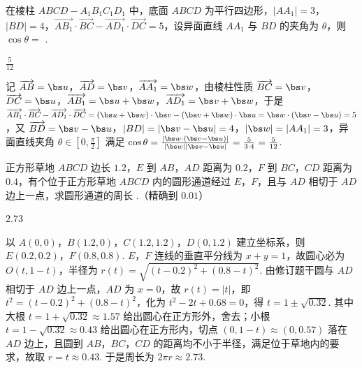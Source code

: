 \begin{problem}
在棱柱 \(ABCD-A_1B_1C_1D_1\) 中，底面 \(ABCD\) 为平行四边形，\(\left|AA_1\right|=3\)，\(\left|BD\right|=4\)，\(\overrightarrow{AB_1}\cdot\overrightarrow{BC}-\overrightarrow{AD_1}\cdot\overrightarrow{DC}=5\)，设异面直线 \(AA_1\) 与 \(BD\) 的夹角为 \(\theta\)，则 \(\cos\theta=\)\fillinblank{} .
\end{problem}

\begin{answer}
\(\frac{5}{12}\)
\end{answer}

\begin{solution}
记 \(\overrightarrow{AB}=\bs u\)，\(\overrightarrow{AD}=\bs v\)，\(\overrightarrow{AA_{1}}=\bs w\)，由棱柱性质 \(\overrightarrow{BC}=\bs v\)，\(\overrightarrow{DC}=\bs u\)，\(\overrightarrow{AB_{1}}=\bs u+\bs w\)，\(\overrightarrow{AD_{1}}=\bs v+\bs w\)，于是 \(\overrightarrow{AB_{1}}\cdot\overrightarrow{BC}-\overrightarrow{AD_{1}}\cdot\overrightarrow{DC}=\left(\bs u+\bs w\right)\cdot\bs v-\left(\bs v+\bs w\right)\cdot\bs u=\bs w\cdot\left(\bs v-\bs u\right)=5\)，又 \(\overrightarrow{BD}=\bs v-\bs u\)，\(\left|BD\right|=\left|\bs v-\bs u\right|=4\)，\(\left|\bs w\right|=\left|AA_{1}\right|=3\)，异面直线夹角 \(\theta\in\left[0,\frac{\pi}{2}\right]\) 满足 \(\cos\theta=\frac{\left|\bs w\cdot\left(\bs v-\bs u\right)\right|}{\left|\bs w\right|\left|\bs v-\bs u\right|}=\frac{5}{3\cdot 4}=\frac{5}{12}\).
\end{solution}

\begin{problem}
正方形草地 \(ABCD\) 边长 \(1.2\)，\(E\) 到 \(AB\)，\(AD\) 距离为 \(0.2\)，\(F\) 到 \(BC\)，\(CD\) 距离为 \(0.4\)，有个位于正方形草地 \(ABCD\) 内的圆形通道经过 \(E\)，\(F\)，且与 \(AD\) 相切于 \(AD\) 边上一点，求圆形通道的周长\fillinblank{} .（精确到 \(0.01\)）

\end{problem}

\begin{answer}
\(2.73\)
\end{answer}

\begin{solution}
以 \(A(0,0)\)，\(B(1.2,0)\)，\(C(1.2,1.2)\)，\(D(0,1.2)\) 建立坐标系，则 \(E(0.2,0.2)\)，\(F(0.8,0.8)\). \(E\)，\(F\) 连线的垂直平分线为 \(x+y=1\)，故圆心必为 \(O(t,1-t)\)，半径为 \(r(t)=\sqrt{\left(t-0.2\right)^{2}+\left(0.8-t\right)^{2}}\). 由修订题干圆与 \(AD\) 相切于 \(AD\) 边上一点，\(AD\) 为 \(x=0\)，故 \(r(t)=\left|t\right|\)，即 \(t^{2}=\left(t-0.2\right)^{2}+\left(0.8-t\right)^{2}\)，化为 \(t^{2}-2t+0.68=0\)，得 \(t=1\pm\sqrt{0.32}\). 其中大根 \(t=1+\sqrt{0.32}\approx 1.57\) 给出圆心在正方形外，舍去；小根 \(t=1-\sqrt{0.32}\approx 0.43\) 给出圆心在正方形内，切点 \(\left(0,1-t\right)\approx\left(0,0.57\right)\) 落在 \(AD\) 边上，且圆到 \(AB\)，\(BC\)，\(CD\) 的距离均不小于半径，满足位于草地内的要求，故取 \(r=t\approx 0.43\). 于是周长为 \(2\pi r\approx 2.73\).
\end{solution}

